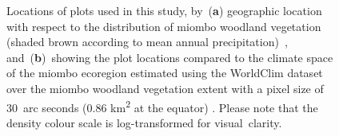 \documentclass[diversity,article,accept,moreauthors,pdftex]{Definitions/mdpi}
\begin{document}
\begin{figure}[H]
	\centering
    \qquad
{}%
\caption{Locations of plots used in this study, by~(\textbf{a}) geographic location with respect to the distribution of miombo woodland vegetation (shaded brown according to mean annual precipitation)~\citep{White1983}, and~(\textbf{b})~showing the plot locations compared to the climate space of the miombo ecoregion estimated using the WorldClim dataset over the miombo woodland vegetation extent with a pixel size of 30~arc seconds (0.86 km\textsuperscript{2} at the equator) \citep{Fick2017}. Please note that the density colour scale is log-transformed for visual~clarity.}\label{fig1}
\end{figure}
\unskip
\end{document}
